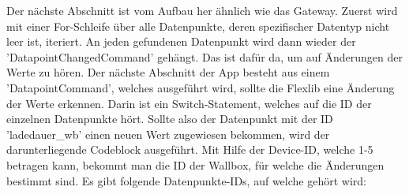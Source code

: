 Der nächste Abschnitt ist vom Aufbau her ähnlich wie das Gateway. Zuerst wird mit einer For-Schleife über alle Datenpunkte, deren spezifischer Datentyp nicht leer ist, iteriert. An jeden gefundenen Datenpunkt wird dann wieder der 'DatapointChangedCommand' gehängt. Das ist dafür da, um auf Änderungen der Werte zu hören. Der nächste Abschnitt der App besteht aus einem 'DatapointCommand', welches ausgeführt wird, sollte die Flexlib eine Änderung der Werte erkennen. Darin ist ein Switch-Statement, welches auf die ID der einzelnen Datenpunkte hört. Sollte also der Datenpunkt mit der ID 'ladedauer\_wb' einen neuen Wert zugewiesen bekommen, wird der darunterliegende Codeblock ausgeführt. Mit Hilfe der Device-ID, welche 1-5 betragen kann, bekommt man die ID der Wallbox, für welche die Änderungen bestimmt sind. Es gibt folgende Datenpunkte-IDs, auf welche gehört wird:


